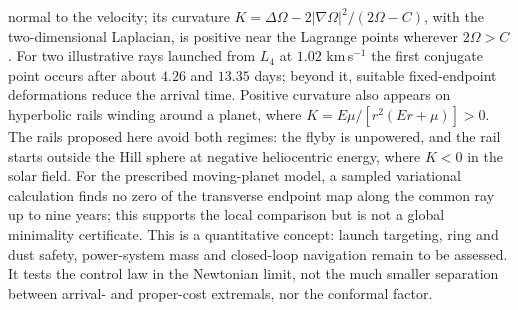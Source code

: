 \documentclass[12pt]{iopart}
\theoremstyle{plain}
\theoremstyle{definition}
\theoremstyle{remark}
\begin{document}
normal to the velocity; its curvature $K=\Delta\Omega-2|\nabla\Omega|^2/(2\Omega-C)$,
with the two-dimensional Laplacian, is positive near the Lagrange points wherever
$2\Omega>C$. For two illustrative rays launched from $L_4$ at $1.02$ km\,s$^{-1}$ the
first conjugate point occurs after about $4.26$ and $13.35$ days; beyond it, suitable
fixed-endpoint deformations reduce the arrival time. Positive curvature also appears
on hyperbolic rails winding around a planet, where $K=E\mu/[r^2(Er+\mu)]>0$. The
rails proposed here avoid both regimes: the flyby is unpowered, and the rail starts
outside the Hill sphere at negative heliocentric energy, where $K<0$ in the solar
field. For the prescribed moving-planet model, a sampled variational calculation
finds no zero of the transverse endpoint map along the common ray up to nine years;
this supports the local comparison but is not a global minimality certificate. This is a quantitative
concept: launch targeting, ring and dust safety, power-system mass and
closed-loop navigation remain to be assessed. It tests the control law in
the Newtonian limit, not the much smaller separation between arrival- and
proper-cost extremals, nor the conformal factor.
\end{document}
